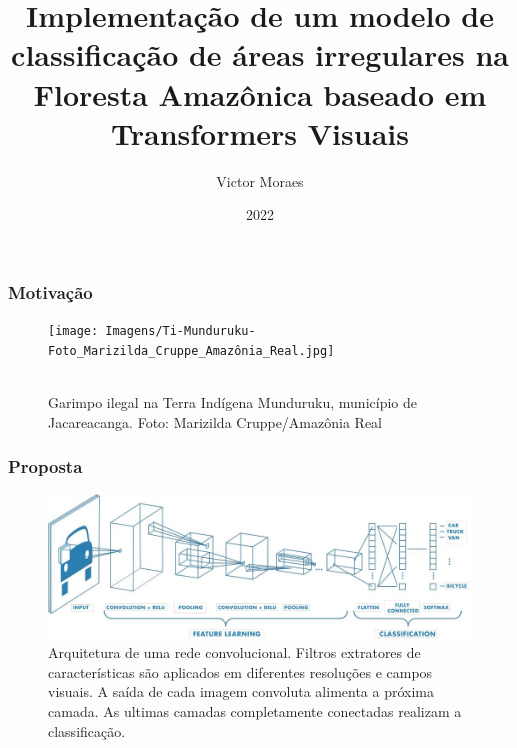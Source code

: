 \documentclass{beamer}
\title{Implementação de um modelo de classificação de áreas irregulares na Floresta Amazônica baseado em Transformers Visuais}
\author{Victor Moraes}
\institute{UFMG}
\date{2022}
\begin{document}
\frame{\titlepage}

\begin{frame}
\frametitle{Motivação}

\begin{figure}[!h]
 \centering
 \texttt{[image: Imagens/Ti-Munduruku-Foto\_Marizilda\_Cruppe\_Amazônia\_Real.jpg]}
 \caption[width=0.2\columnwidth]{\\\small Garimpo ilegal na Terra Indígena Munduruku, município de Jacareacanga. Foto: Marizilda Cruppe/Amazônia Real}
\label{fig:garimpo}
\end{figure}


\end{frame}

\begin{frame}
\frametitle{Proposta}
\begin{figure}[!ht]
    \centering
    \includegraphics[width=0.95\columnwidth]{
        Imagens/CNN_mathworks.jpg
    }
    \caption{Arquitetura de uma rede convolucional. Filtros extratores de características são aplicados em diferentes resoluções e campos visuais. A saída de cada imagem convoluta alimenta a próxima camada. As ultimas camadas completamente conectadas realizam a classificação.}
    \label{fig:cnn}
\end{figure}
\end{frame}
\end{document}
